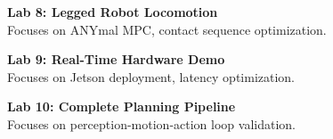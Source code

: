 \vspace{0.2cm}

\noindent\textbf{Lab 8: Legged Robot Locomotion} \\
Focuses on ANYmal MPC, contact sequence optimization.

\vspace{0.2cm}

\noindent\textbf{Lab 9: Real-Time Hardware Demo} \\
Focuses on Jetson deployment, latency optimization.

\vspace{0.2cm}

\noindent\textbf{Lab 10: Complete Planning Pipeline} \\
Focuses on perception-motion-action loop validation.

\vspace{0.2cm}

\newpage
{}
